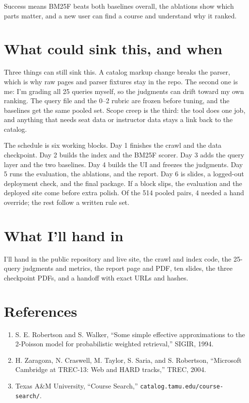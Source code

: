 \documentclass[10pt]{article}
\begin{document}
Success means BM25F beats both baselines overall, the ablations show which parts matter, and a new user can find a course and understand why it ranked.


\section*{What could sink this, and when}
Three things can still sink this. A catalog markup change breaks the parser, which is why raw pages and parser fixtures stay in the repo. The second one is me: I'm grading all 25 queries myself, so the judgments can drift toward my own ranking. The query file and the 0--2 rubric are frozen before tuning, and the baselines get the same pooled set. Scope creep is the third: the tool does one job, and anything that needs seat data or instructor data stays a link back to the catalog.

The schedule is six working blocks. Day 1 finishes the crawl and the data checkpoint. Day 2 builds the index and the BM25F scorer. Day 3 adds the query layer and the two baselines. Day 4 builds the UI and freezes the judgments. Day 5 runs the evaluation, the ablations, and the report. Day 6 is slides, a logged-out deployment check, and the final package. If a block slips, the evaluation and the deployed site come before extra polish. Of the 514 pooled pairs, 4 needed a hand override; the rest follow a written rule set.

\section*{What I'll hand in}
I'll hand in the public repository and live site, the crawl and index code, the 25-query judgments and metrics, the report page and PDF, ten slides, the three checkpoint PDFs, and a handoff with exact URLs and hashes.

\section*{References}
\begin{enumerate}
\item S. E. Robertson and S. Walker, ``Some simple effective approximations to the 2-Poisson model for probabilistic weighted retrieval,'' SIGIR, 1994.
\item H. Zaragoza, N. Craswell, M. Taylor, S. Saria, and S. Robertson, ``Microsoft Cambridge at TREC-13: Web and HARD tracks,'' TREC, 2004.
\item Texas A\&M University, ``Course Search,'' \texttt{catalog.tamu.edu/course-search/}.
\end{enumerate}
\end{document}
